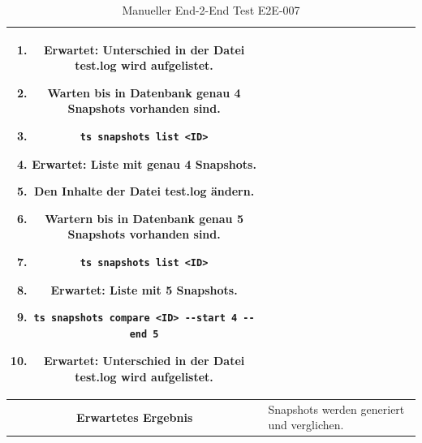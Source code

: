 \documentclass[a4paper,12pt]{report}
\begin{document}
\begin{table}[h!]
\begin{tabular}{|c|p{10cm}|}
\begin{enumerate}
                \item Erwartet: Unterschied in der Datei test.log wird aufgelistet.
                \item Warten bis in Datenbank genau 4 Snapshots vorhanden sind.
                \item \begin{verbatim}ts snapshots list <ID>\end{verbatim}
                \item Erwartet: Liste mit genau 4 Snapshots.
                \item Den Inhalte der Datei test.log ändern.
                \item Wartern bis in Datenbank genau 5 Snapshots vorhanden sind.
                \item \begin{verbatim}ts snapshots list <ID>\end{verbatim}
                \item Erwartet: Liste mit 5 Snapshots.
                \item \begin{verbatim}ts snapshots compare <ID> --start 4 --end 5\end{verbatim}
                \item Erwartet: Unterschied in der Datei test.log wird aufgelistet.
            \end{enumerate} \\ \hline
            \textbf{Erwartetes Ergebnis} & Snapshots werden generiert und verglichen. \\ \hline
        \end{tabular}
        \caption{Manueller End-2-End Test E2E-007}\label{tab:e2e-7}
    \end{table}
\end{document}
